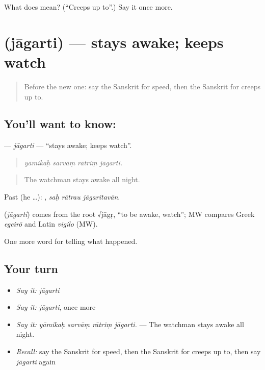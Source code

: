 \begin{tcolorbox}[breakable,colback=teal!4,colframe=teal!35!black,title={Before you move on}]
What does  mean? (\textquotedblleft{}Creeps up to\textquotedblright{}.) Say it once more.
\end{tcolorbox}
\section[\texorpdfstring{\sk{जागर्ति} (jāgarti)}{जागर्ति (jāgarti)}]{ (jāgarti) — stays awake; keeps watch}

\label{lesson:SA-C287-jagarti}



\begin{quote}
Before the new one: say the Sanskrit for speed, then the Sanskrit for creeps up to.
\end{quote}

\subsection*{You'll want to know: }
\textbf{} — \emph{jāgarti} — \textquotedblleft{}stays awake; keeps watch\textquotedblright{}.

\begin{quote}
   
\end{quote}

\begin{quote}
\emph{yāmikaḥ sarvāṃ rātriṃ jāgarti.}
\end{quote}

\begin{quote}
The watchman stays awake all night.
\end{quote}

Past (he …):   , \emph{saḥ rātrau jāgaritavān}.

\begin{cousinweb}
\textbf{} (\emph{jāgarti}) comes from the root √jāgṛ, \textquotedblleft{}to be awake, watch\textquotedblright{}; MW compares Greek \emph{egeirō} and Latin \emph{vigilo} (MW).
\end{cousinweb}

\begin{grammarlens}[title={What you've built}]
One more word for telling what happened.
\end{grammarlens}

\subsection*{Your turn}
\begin{itemize}
\raggedright
  \item \emph{Say it:} \emph{jāgarti}
  \item \emph{Say it:} \emph{jāgarti}, once more
  \item \emph{Say it:} \emph{yāmikaḥ sarvāṃ rātriṃ jāgarti.} — The watchman stays awake all night.
  \item \emph{Recall:} say the Sanskrit for speed, then the Sanskrit for creeps up to, then say \emph{jāgarti} again
\end{itemize}

